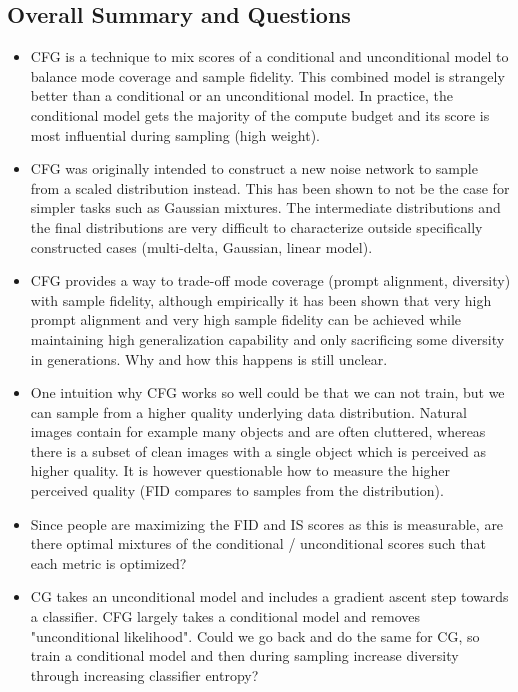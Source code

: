 \documentclass{article}
\begin{document}
\subsection*{Overall Summary and Questions}
\begin{itemize}
    \item CFG is a technique to mix scores of a conditional and unconditional model to balance mode coverage and sample fidelity. This combined model is strangely better than a conditional or an unconditional model. In practice, the conditional model gets the majority of the compute budget and its score is most influential during sampling (high weight).
    \item CFG was originally intended to construct a new noise network to sample from a scaled distribution instead. This has been shown to not be the case for simpler tasks such as Gaussian mixtures. The intermediate distributions and the final distributions are very difficult to characterize outside specifically constructed cases (multi-delta, Gaussian, linear model).
    \item CFG provides a way to trade-off mode coverage (prompt alignment, diversity) with sample fidelity, although empirically it has been shown that very high prompt alignment and very high sample fidelity can be achieved while maintaining high generalization capability and only sacrificing some diversity in generations. Why and how this happens is still unclear.
    \item One intuition why CFG works so well could be that we can not train, but we can sample from a higher quality underlying data distribution. Natural images contain for example many objects and are often cluttered, whereas there is a subset of clean images with a single object which is perceived as higher quality. It is however questionable how to measure the higher perceived quality (FID compares to samples from the distribution).
    \item Since people are maximizing the FID and IS scores as this is measurable, are there optimal mixtures of the conditional / unconditional scores such that each metric is optimized?
    \item CG takes an unconditional model and includes a gradient ascent step towards a classifier. CFG largely takes a conditional model and removes "unconditional likelihood". Could we go back and do the same for CG, so train a conditional model and then during sampling increase diversity through increasing classifier entropy?
\end{itemize}
\end{document}
